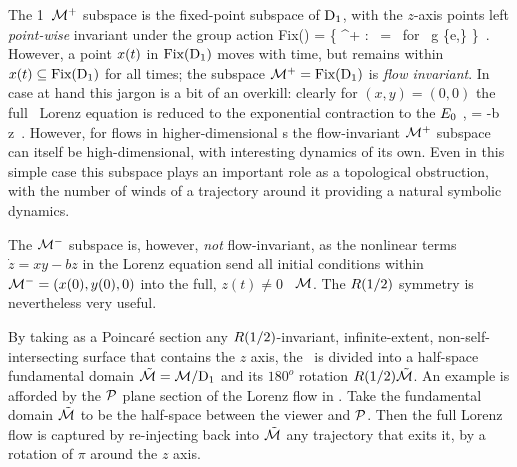 The 1\dmn\ ${\cal M}^+$ subspace is
the fixed-point subspace of $\mathrm{D}_1$, with the $z$-axis
points left \emph{point-wise} invariant under the group
action
\beq
\mbox{Fix}(\Ztwo) =
   \{ \ssp \in \pS^+ :  \, \ssp = \ssp \mbox{ for } g \in \{e,\} \}
\,.
However, a point $x(t)$ in $\mbox{Fix}(\mathrm{D}_{1})$ moves with time,
but remains within $x(t) \subseteq \mbox{Fix}(\mathrm{D}_{1})$ for all
times; the  subspace ${\cal M}^+ = \mbox{Fix}(\mathrm{D}_{1})$ is {\em flow
invariant}. In case at hand this jargon is a bit of an
overkill: clearly for $(x,y)=(0,0)$ the full \statesp\ Lorenz
equation  is reduced to the exponential
contraction to the $E_{0}$ \eqv,
\beq
{} = -b \, z
\,.
However, for flows in higher-dimensional \statesp s the
flow-invariant ${\cal M}^+$ subspace can itself be high-dimensional, with
interesting dynamics of its own.
Even in this simple case this subspace plays an important role
as a topological obstruction, with
the number of winds of a trajectory around it providing
a natural symbolic dynamics.

The ${\cal M}^-$ subspace is, however, {\em not} flow-invariant, as the nonlinear
terms $\dot{z}=xy - bz$ in the Lorenz equation 
send all initial conditions within
${\cal M}^-=(x(0),y(0),0)$ into the full, $z(t) \neq 0$ \statesp\  ${\cal M}$.
The $R(1/2)$ symmetry is nevertheless very useful.

By taking as a Poincar\'e section %
any  $R(1/2)$-invariant, infinite-extent, non-self-inter\-sect\-ing
surface that contains the
$z$ axis, the \statesp\ is divided into a half-space fundamental
domain $\tilde{{\cal M}}={\cal M}/\mathrm{D}_1$ and its $180^o$ rotation $R(1/2)\tilde{{\cal M}}$.
An example is afforded by the ${\cal P}$ plane section of
the Lorenz flow in . Take
the  fundamental domain $\tilde{{\cal M}}$ to be the half-space between the
viewer and ${\cal P}$. Then the full Lorenz
flow is captured by re-injecting back into $\tilde{{\cal M}}$
any trajectory that exits it, by a rotation of $\pi$ around the $z$ axis.

